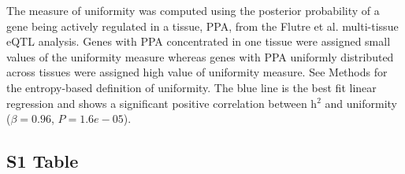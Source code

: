 \documentclass[10pt,letterpaper]{article}
\begin{document}
The measure of uniformity was computed using the posterior probability of a gene being actively regulated in a tissue, PPA, from the Flutre et al. \cite{Flutre_2013} multi-tissue eQTL analysis. Genes with PPA concentrated in one tissue were assigned small values of the uniformity measure whereas genes with PPA uniformly distributed across tissues were assigned high value of uniformity measure. See Methods for the entropy-based definition of uniformity. The blue line is the best fit linear regression and shows a significant positive correlation between h$^2$ and uniformity ($\beta = 0.96$, $P = 1.6e-05$).
\pagebreak


\subsection*{S1 Table}
\label{S1_Table}
\end{document}
